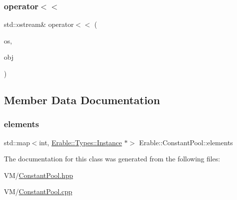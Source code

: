 \subsubsection{\texorpdfstring{operator$<$$<$}{operator<<}}
{\footnotesize\ttfamily std\+::ostream\& operator$<$$<$ (\begin{DoxyParamCaption}\item[{std\+::ostream \&}]{os,  }\item[{\mbox{\hyperlink{class_erable_1_1_constant_pool}{Constant\+Pool}} \&}]{obj }\end{DoxyParamCaption})\hspace{0.3cm}{\ttfamily [friend]}}



\subsection{Member Data Documentation}
\mbox{\label{class_erable_1_1_constant_pool_a5f02e366a42ade736b908744e1052b09}} 
\subsubsection{\texorpdfstring{elements}{elements}}
{\footnotesize\ttfamily std\+::map$<$int, \mbox{\hyperlink{class_erable_1_1_erable_1_1_types_1_1_instance}{Erable\+::\+Types\+::\+Instance}} $\ast$$>$ Erable\+::\+Constant\+Pool\+::elements\hspace{0.3cm}{\ttfamily [private]}}



The documentation for this class was generated from the following files\+:\begin{DoxyCompactItemize}
\item 
V\+M/\mbox{\hyperlink{_constant_pool_8hpp}{Constant\+Pool.\+hpp}}\item 
V\+M/\mbox{\hyperlink{_constant_pool_8cpp}{Constant\+Pool.\+cpp}}\end{DoxyCompactItemize}
